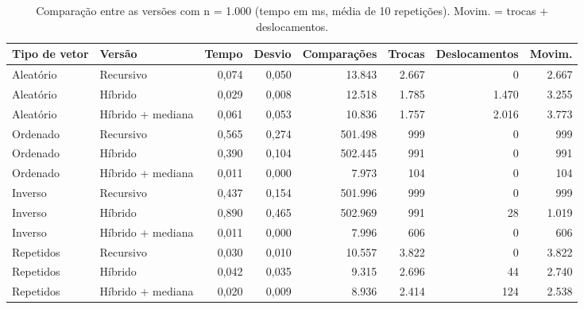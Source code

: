 \begin{table}[htbp]
  \centering
  \small
  \setlength{\tabcolsep}{4pt}
  \caption{Comparação entre as versões com n = 1.000 (tempo em ms, média de 10 repetições). Movim. = trocas + deslocamentos.}
  \label{tab:comparacao-n1000}
  \begin{tabular}{llrrrrrr}
    \toprule
    Tipo de vetor & Versão & Tempo & Desvio & Comparações & Trocas & Deslocamentos & Movim. \\
    \midrule
    Aleatório & Recursivo & 0,074 & 0,050 & 13.843 & 2.667 & 0 & 2.667 \\
    Aleatório & Híbrido & 0,029 & 0,008 & 12.518 & 1.785 & 1.470 & 3.255 \\
    Aleatório & Híbrido + mediana & 0,061 & 0,053 & 10.836 & 1.757 & 2.016 & 3.773 \\
    Ordenado & Recursivo & 0,565 & 0,274 & 501.498 & 999 & 0 & 999 \\
    Ordenado & Híbrido & 0,390 & 0,104 & 502.445 & 991 & 0 & 991 \\
    Ordenado & Híbrido + mediana & 0,011 & 0,000 & 7.973 & 104 & 0 & 104 \\
    Inverso & Recursivo & 0,437 & 0,154 & 501.996 & 999 & 0 & 999 \\
    Inverso & Híbrido & 0,890 & 0,465 & 502.969 & 991 & 28 & 1.019 \\
    Inverso & Híbrido + mediana & 0,011 & 0,000 & 7.996 & 606 & 0 & 606 \\
    Repetidos & Recursivo & 0,030 & 0,010 & 10.557 & 3.822 & 0 & 3.822 \\
    Repetidos & Híbrido & 0,042 & 0,035 & 9.315 & 2.696 & 44 & 2.740 \\
    Repetidos & Híbrido + mediana & 0,020 & 0,009 & 8.936 & 2.414 & 124 & 2.538 \\
    \bottomrule
  \end{tabular}
\end{table}
